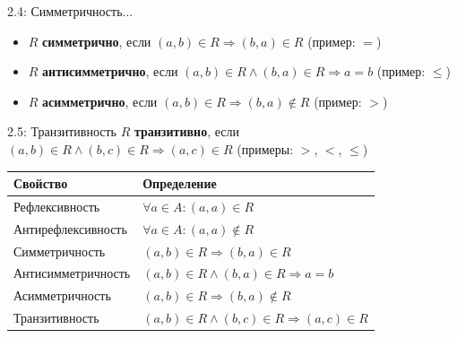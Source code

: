 \documentclass[a4paper,12pt]{article}
\begin{document}
	\begin{definitionbox}{2.4: Симметричность...}
		\begin{itemize}
			\item $R$ \textbf{симметрично}, если $(a,b) \in R \Rightarrow (b,a) \in R$ (пример: $=$)
			\item $R$ \textbf{антисимметрично}, если $(a,b) \in R \land (b,a) \in R \Rightarrow a = b$ (пример: $\le$)
			\item $R$ \textbf{асимметрично}, если $(a,b) \in R \Rightarrow (b,a) \notin R$ (пример: $>$)
		\end{itemize}
	\end{definitionbox}
	
	\begin{definitionbox}{2.5: Транзитивность}
		$R$ \textbf{транзитивно}, если $(a,b) \in R \land (b,c) \in R \Rightarrow (a,c) \in R$ (примеры: $>$, $<$, $\le$)
	\end{definitionbox}
	
	\begin{center}
		\begin{tabular}{|l|l|}
			\hline
			\textbf{Свойство} & \textbf{Определение} \\ \hline
			Рефлексивность & $\forall a \in A: (a,a) \in R$ \\ \hline
			Антирефлексивность & $\forall a \in A: (a,a) \notin R$ \\ \hline
			Симметричность & $(a,b) \in R \Rightarrow (b,a) \in R$ \\ \hline
			Антисимметричность & $(a,b) \in R \land (b,a) \in R \Rightarrow a = b$ \\ \hline
			Асимметричность & $(a,b) \in R \Rightarrow (b,a) \notin R$ \\ \hline
			Транзитивность & $(a,b) \in R \land (b,c) \in R \Rightarrow (a,c) \in R$ \\ \hline
		\end{tabular}
	\end{center}
	
	
	
\end{document}
